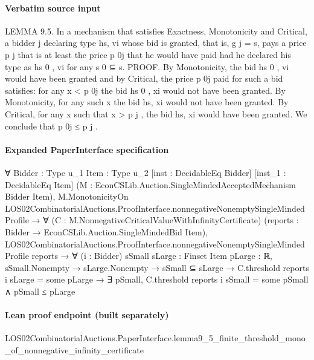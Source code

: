 \documentclass[10pt]{article}
\begin{document}
\paragraph{Verbatim source input}
\begin{ReviewVerbatim}
LEMMA 9.5. In a mechanism that satisfies Exactness, Monotonicity and Critical, a bidder j declaring type hs, vi whose bid is granted, that is, g j = s, pays a
price p j that is at least the price p 0j that he would have paid had he declared his
type as hs 0 , vi for any s 0 ⊆ s.
PROOF. By Monotonicity, the bid hs 0 , vi would have been granted and by Critical, the price p 0j paid for such a bid satisfies: for any x < p 0j the bid hs 0 , xi would
not have been granted. By Monotonicity, for any such x the bid hs, xi would not
have been granted. By Critical, for any x such that x > p j , the bid hs, xi would
have been granted. We conclude that p 0j ≤ p j .
\end{ReviewVerbatim}


\paragraph{Expanded PaperInterface specification}
\begin{ReviewVerbatim}
∀ {Bidder : Type u_1} {Item : Type u_2} [inst : DecidableEq Bidder] [inst_1 : DecidableEq Item]
  (M : EconCSLib.Auction.SingleMindedAcceptedMechanism Bidder Item),
  M.MonotonicityOn LOS02CombinatorialAuctions.ProofInterface.nonnegativeNonemptySingleMindedProfile →
    ∀ (C : M.NonnegativeCriticalValueWithInfinityCertificate)
      (reports : Bidder → EconCSLib.Auction.SingleMindedBid Item),
      LOS02CombinatorialAuctions.ProofInterface.nonnegativeNonemptySingleMindedProfile reports →
        ∀ (i : Bidder) {sSmall sLarge : Finset Item} {pLarge : ℝ},
          sSmall.Nonempty →
            sLarge.Nonempty →
              sSmall ⊆ sLarge →
                C.threshold reports i sLarge = some pLarge →
                  ∃ pSmall, C.threshold reports i sSmall = some pSmall ∧ pSmall ≤ pLarge
\end{ReviewVerbatim}

\paragraph{Lean proof endpoint (built separately)}\begin{ReviewVerbatim}
LOS02CombinatorialAuctions.PaperInterface.lemma9_5_finite_threshold_mono_of_nonnegative_infinity_certificate
\end{ReviewVerbatim}
\end{document}

